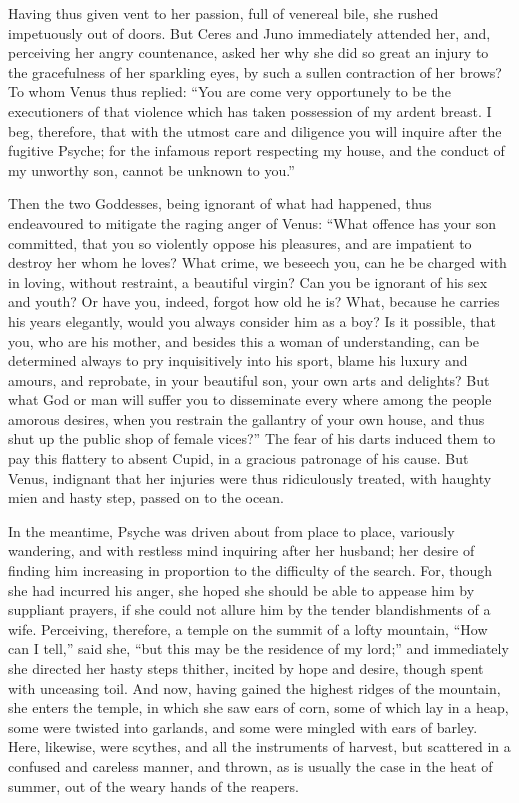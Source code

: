 \documentclass[12pt]{article}
\begin{document}
Having thus given vent to her passion, full of venereal bile, she rushed
impetuously out of doors. But Ceres and Juno immediately attended her, and,
perceiving her angry countenance, asked her why she did so great an injury to
the gracefulness of her sparkling eyes, by such a sullen contraction of her
brows? To whom Venus thus replied: ``You are come very opportunely to be the
executioners of that violence which has taken possession of my ardent breast. I
beg, therefore, that with the utmost care and diligence you will inquire after
the fugitive Psyche; for the infamous report respecting my house, and the
conduct of my unworthy son, cannot be unknown to you.''

Then the two Goddesses, being ignorant of what had happened, thus endeavoured
to mitigate the raging anger of Venus: ``What offence has your son committed,
that you so violently oppose his pleasures, and are impatient to destroy her
whom he loves? What crime, we beseech you, can he be charged with in loving,
without restraint, a beautiful virgin? Can you be ignorant of his sex and
youth? Or have you, indeed, forgot how old he is? What, because he carries his
years elegantly, would you always consider him as a boy? Is it possible, that
you, who are his mother, and besides this a woman of understanding, can be
determined always to pry inquisitively into his sport, blame his luxury and
amours, and reprobate, in your beautiful son, your own arts and delights? But
what God or man will suffer you to disseminate every where among the people
amorous desires, when you restrain the gallantry of your own house, and thus
shut up the public shop of female vices?'' The fear of his darts induced them
to pay this flattery to absent Cupid, in a gracious patronage of his cause. But
Venus, indignant that her injuries were thus ridiculously treated, with haughty
mien and hasty step, passed on to the ocean.

In the meantime, Psyche was driven about from place to place, variously
wandering, and with restless mind inquiring after her husband; her desire of
finding him increasing in proportion to the difficulty of the search. For,
though she had incurred his anger, she hoped she should be able to appease him
by suppliant prayers, if she could not allure him by the tender blandishments
of a wife. Perceiving, therefore, a temple on the summit of a lofty mountain,
``How can I tell,'' said she, ``but this may be the residence of my lord;'' and
immediately she directed her hasty steps thither, incited by hope and desire,
though spent with unceasing toil. And now, having gained the highest ridges of
the mountain, she enters the temple, in which she saw ears of corn, some of
which lay in a heap, some were twisted into garlands, and some were mingled
with ears of barley. Here, likewise, were scythes, and all the instruments of
harvest, but scattered in a confused and careless manner, and thrown, as is
usually the case in the heat of summer, out of the weary hands of the reapers.
\end{document}
